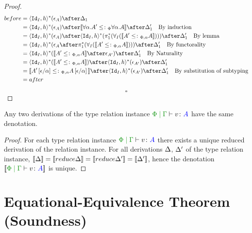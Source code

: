 \documentclass{report}
\begin{document}
\begin{framed}
\begin{proof}
                \begin{align*}
                    before &= \pr{\Id{I}}{h}\star(\e_A)\after\D_1\\
                    &= \pr{\Id{I}}{h}\star(\e_A)\after\deno{\all{\a}{A'}\subtypep{\all{\a}{A}}}\after\D_1'\qt{By induction}\\
                    &= \pr{\Id{I}}{h}\star(\e_A)\after\pr{\Id{I}}{h}\star(\pstar(\allI(\deno{A' \subtypepa A})))\after\D_1'\qt{By lemma}\\
                    &= \pr{\Id{I}}{h}\star(\e_A\after \pstar(\allI(\deno{A' \subtypepa A})))\after\D_1'\qt{By functorality}\\
                    & = \pr{\Id{I}}{h}\star(\deno{A' \subtypepa A}\after\e_{A'})\after\D_1'\qt{By Naturality}\\
                    & =  \pr{\Id{I}}{h}\star(\deno{A' \subtypepa A})\after\pr{\Id{I}}{h}\star(\e_{A'})\after\D_1'\\
                    & =  \deno{A'\ssub{\a}{\e} \subtypepa A\ssub{\a}{\e}}\after\pr{\Id{I}}{h}\star(\e_{A'})\after\D_1'\qt{By substitution of subtyping}\\
                    & = after
                \end{align*}
                
            $$\square$$   
    \end{proof}
    
\end{framed}
\begin{theorem}
    Any two derivations of the type relation instance $\gpetyperelation{v}{A}$ have the same denotation.
\end{theorem}

\begin{framed}
    \begin{proof}
            For each type relation instance $\gpetyperelation{v}{A}$ there exists a unique reduced derivation of the relation instance. For all derivations $\Delta$, $\Delta'$ of the type relation instance, $\deno{\D} = \deno{\reduce{\D}} = \deno{\reduce{\D'}} = \deno{\D'} $, hence the denotation $\deno{\gpetyperelation{v}{A}}$ is unique.
    \end{proof}
\end{framed}


\chapter{Equational-Equivalence Theorem (Soundness)}
\end{document}
